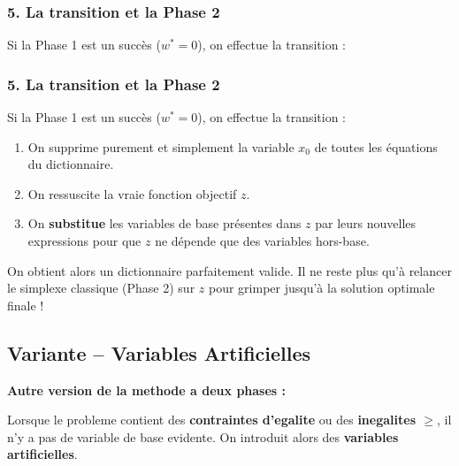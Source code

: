 \documentclass[12pt,a4paper]{article}
\begin{document}
\subsubsection*{5. La transition et la Phase 2}
Si la Phase 1 est un succès ($w^* = 0$), on effectue la transition :
\subsubsection*{5. La transition et la Phase 2}
Si la Phase 1 est un succès ($w^* = 0$), on effectue la transition :
\begin{enumerate}
    \item On supprime purement et simplement la variable $x_0$ de toutes les équations du dictionnaire.
    \item On ressuscite la vraie fonction objectif $z$.
    \item On \textbf{substitue} les variables de base présentes dans $z$ par leurs nouvelles expressions pour que $z$ ne dépende que des variables hors-base.
\end{enumerate}
On obtient alors un dictionnaire parfaitement valide. Il ne reste plus qu'à relancer le simplexe classique (Phase 2) sur $z$ pour grimper jusqu'à la solution optimale finale !

\newpage
\subsection{Variante -- Variables Artificielles}

\begin{notecours}
\textbf{Autre version de la methode a deux phases :}

Lorsque le probleme contient des \textcolor{titrebleu}{\textbf{contraintes d'egalite}} ou des \textbf{inegalites $\geq$}, il n'y a pas de variable de base evidente. On introduit alors des \textcolor{algoviolet}{\textbf{variables artificielles}}.
\end{notecours}
\end{document}
